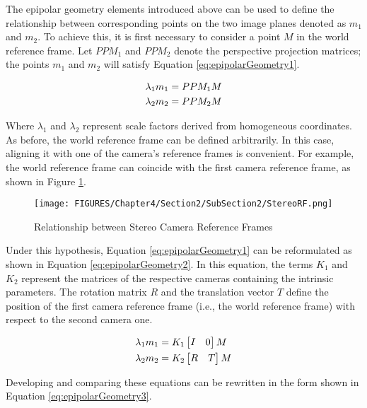 The epipolar geometry elements introduced above can be used to define the relationship between corresponding points on the two image planes denoted as $m_1$ and $m_2$.  
To achieve this, it is first necessary to consider a point $M$ in the world reference frame.  
Let $PPM_1$ and $PPM_2$ denote the perspective projection matrices; the points $m_1$ and $m_2$ will satisfy Equation \ref{eq:epipolarGeometry1}.

\begin{align}
    \label{eq:epipolarGeometry1}
    \lambda_1 m_1 &= PPM_1 M \notag \\
    \lambda_2 m_2 &= PPM_2 M
\end{align}

Where  $\lambda_1$ and $\lambda_2$ represent scale factors derived from homogeneous coordinates.
As before, the world reference frame can be defined arbitrarily. In this case, aligning it with one of the camera's reference frames is convenient. For example, the world reference frame can coincide with the first camera reference frame, as shown in Figure \ref{fig:StereoRF}.

\begin{figure}[!h]
  \centering
  \texttt{[image: FIGURES/Chapter4/Section2/SubSection2/StereoRF.png]}
  \caption{Relationship between Stereo Camera Reference Frames} 
  \label{fig:StereoRF}  
\end{figure}

Under this hypothesis, Equation \ref{eq:epipolarGeometry1} can be reformulated as shown in Equation \ref{eq:epipolarGeometry2}.  
In this equation, the terms $K_1$ and $K_2$ represent the matrices of the respective cameras containing the intrinsic parameters. The rotation matrix $R$ and the translation vector $T$ define the position of the first camera reference frame (i.e., the world reference frame) with respect to the second camera one.

\begin{align}
    \label{eq:epipolarGeometry2}
    \lambda_1 m_1 &= 
        K_1 \begin{bmatrix} I & 0 \end{bmatrix} M \notag \\
    \lambda_2 m_2 &= 
        K_2 \begin{bmatrix} R & T \end{bmatrix} M  
\end{align}

Developing and comparing these equations can be rewritten in the form shown in Equation \ref{eq:epipolarGeometry3}.

